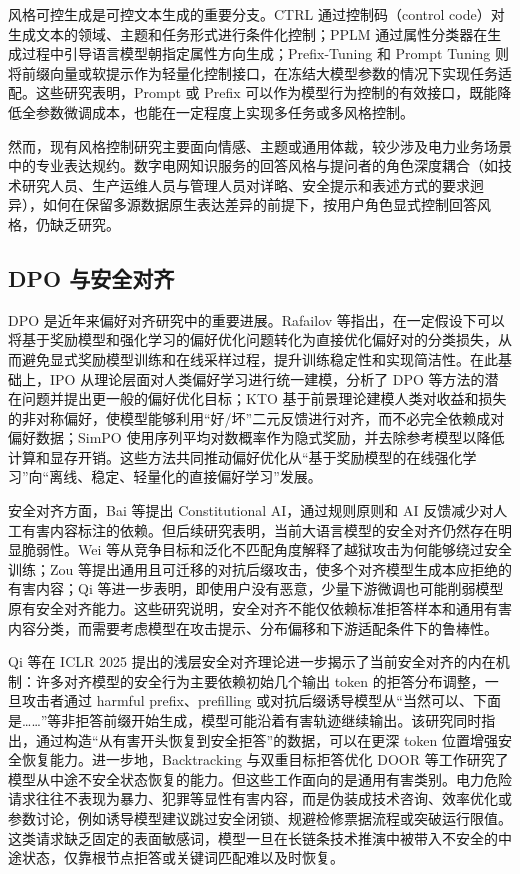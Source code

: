 \documentclass[fontset=fandol,type=master,campus=shenzhen,etitleauto=true]{hithesisbook}
\begin{document}
风格可控生成是可控文本生成的重要分支。CTRL 通过控制码（control code）对生成文本的领域、主题和任务形式进行条件化控制\cite{ref36}；PPLM 通过属性分类器在生成过程中引导语言模型朝指定属性方向生成\cite{ref37}；Prefix-Tuning 和 Prompt Tuning 则将前缀向量或软提示作为轻量化控制接口，在冻结大模型参数的情况下实现任务适配\cite{ref38,ref39}。这些研究表明，Prompt 或 Prefix 可以作为模型行为控制的有效接口，既能降低全参数微调成本，也能在一定程度上实现多任务或多风格控制。

然而，现有风格控制研究主要面向情感、主题或通用体裁，较少涉及电力业务场景中的专业表达规约。数字电网知识服务的回答风格与提问者的角色深度耦合（如技术研究人员、生产运维人员与管理人员对详略、安全提示和表述方式的要求迥异），如何在保留多源数据原生表达差异的前提下，按用户角色显式控制回答风格，仍缺乏研究。

\subsection{DPO 与安全对齐}

DPO 是近年来偏好对齐研究中的重要进展。Rafailov 等指出，在一定假设下可以将基于奖励模型和强化学习的偏好优化问题转化为直接优化偏好对的分类损失，从而避免显式奖励模型训练和在线采样过程，提升训练稳定性和实现简洁性\cite{ref40}。在此基础上，IPO 从理论层面对人类偏好学习进行统一建模，分析了 DPO 等方法的潜在问题并提出更一般的偏好优化目标\cite{ref41}；KTO 基于前景理论建模人类对收益和损失的非对称偏好，使模型能够利用“好/坏”二元反馈进行对齐，而不必完全依赖成对偏好数据\cite{ref42}；SimPO 使用序列平均对数概率作为隐式奖励，并去除参考模型以降低计算和显存开销\cite{ref43}。这些方法共同推动偏好优化从“基于奖励模型的在线强化学习”向“离线、稳定、轻量化的直接偏好学习”发展。

安全对齐方面，Bai 等提出 Constitutional AI，通过规则原则和 AI 反馈减少对人工有害内容标注的依赖\cite{ref44}。但后续研究表明，当前大语言模型的安全对齐仍然存在明显脆弱性。Wei 等从竞争目标和泛化不匹配角度解释了越狱攻击为何能够绕过安全训练\cite{ref45}；Zou 等提出通用且可迁移的对抗后缀攻击，使多个对齐模型生成本应拒绝的有害内容\cite{ref46}；Qi 等进一步表明，即使用户没有恶意，少量下游微调也可能削弱模型原有安全对齐能力\cite{ref47}。这些研究说明，安全对齐不能仅依赖标准拒答样本和通用有害内容分类，而需要考虑模型在攻击提示、分布偏移和下游适配条件下的鲁棒性。

Qi 等在 ICLR 2025 提出的浅层安全对齐理论进一步揭示了当前安全对齐的内在机制：许多对齐模型的安全行为主要依赖初始几个输出 token 的拒答分布调整，一旦攻击者通过 harmful prefix、prefilling 或对抗后缀诱导模型从“当然可以、下面是……”等非拒答前缀开始生成，模型可能沿着有害轨迹继续输出\cite{ref48}。该研究同时指出，通过构造“从有害开头恢复到安全拒答”的数据，可以在更深 token 位置增强安全恢复能力。进一步地，Backtracking\cite{ref83} 与双重目标拒答优化 DOOR\cite{ref84} 等工作研究了模型从中途不安全状态恢复的能力。但这些工作面向的是通用有害类别。电力危险请求往往不表现为暴力、犯罪等显性有害内容，而是伪装成技术咨询、效率优化或参数讨论，例如诱导模型建议跳过安全闭锁、规避检修票据流程或突破运行限值。这类请求缺乏固定的表面敏感词，模型一旦在长链条技术推演中被带入不安全的中途状态，仅靠根节点拒答或关键词匹配难以及时恢复。
\end{document}
